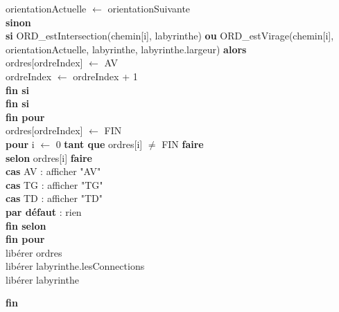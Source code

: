 \begin{flushleft}
    \hspace*{3cm}orientationActuelle $\gets$ orientationSuivante\\
    \hspace*{2cm}\textbf{sinon}\\
    \hspace*{3cm}\textbf{si} ORD\_estIntersection(chemin[i], labyrinthe) \textbf{ou} ORD\_estVirage(chemin[i], orientationActuelle, labyrinthe, labyrinthe.largeur) \textbf{alors}\\
    \hspace*{4cm}ordres[ordreIndex] $\gets$ AV\\
    \hspace*{4cm}ordreIndex $\gets$ ordreIndex + 1\\
    \hspace*{3cm}\textbf{fin si}\\
    \hspace*{2cm}\textbf{fin si}\\
    \hspace*{1cm}\textbf{fin pour}\\
    \hspace*{1cm}ordres[ordreIndex] $\gets$ FIN\\

    \hspace*{1cm}\textbf{pour} i $\gets$ 0 \textbf{tant que} ordres[i] $\neq$ FIN \textbf{faire}\\
    \hspace*{2cm}\textbf{selon} ordres[i] \textbf{faire}\\
    \hspace*{3cm}\textbf{cas} AV : afficher "AV"\\
    \hspace*{3cm}\textbf{cas} TG : afficher "TG"\\
    \hspace*{3cm}\textbf{cas} TD : afficher "TD"\\
    \hspace*{3cm}\textbf{par défaut} : rien\\
    \hspace*{2cm}\textbf{fin selon}\\
    \hspace*{1cm}\textbf{fin pour}\\
    \hspace*{1cm}libérer ordres\\
    \hspace*{1cm}libérer labyrinthe.lesConnections\\
    \hspace*{1cm}libérer labyrinthe
\end{flushleft}
\textbf{fin}
